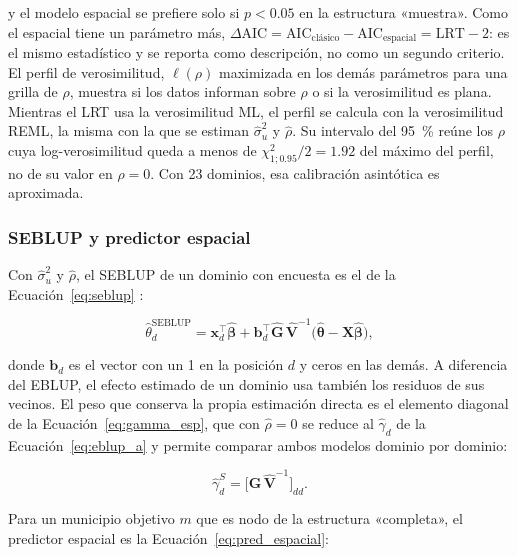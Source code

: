 y el modelo espacial se prefiere solo si $p < 0.05$ en la estructura «muestra». Como el espacial tiene un parámetro más, $\Delta\text{AIC} = \text{AIC}_{\text{clásico}} - \text{AIC}_{\text{espacial}} = \text{LRT} - 2$: es el mismo estadístico y se reporta como descripción, no como un segundo criterio. El perfil de verosimilitud, $\ell(\rho)$ maximizada en los demás parámetros para una grilla de $\rho$, muestra si los datos informan sobre $\rho$ o si la verosimilitud es plana. Mientras el LRT usa la verosimilitud ML, el perfil se calcula con la verosimilitud REML, la misma con la que se estiman $\hat{\sigma}_u^2$ y $\hat{\rho}$. Su intervalo del 95~\% reúne los $\rho$ cuya log-verosimilitud queda a menos de $\chi^2_{1;0.95}/2 = 1.92$ del máximo del perfil, no de su valor en $\rho = 0$. Con 23 dominios, esa calibración asintótica es aproximada.

\subsubsection{SEBLUP y predictor espacial}

Con $\hat{\sigma}_u^2$ y $\hat{\rho}$, el SEBLUP de un dominio con encuesta es el de la Ecuación~\ref{eq:seblup} \cite[p.~491]{morales2021smallarea}:

\begin{equation}
    \hat{\theta}_d^{\text{SEBLUP}} = \mathbf{x}_d^\top\hat{\boldsymbol{\beta}} + \mathbf{b}_d^\top \hat{\mathbf{G}}\, \hat{\mathbf{V}}^{-1}\big(\hat{\boldsymbol{\theta}} - \mathbf{X}\hat{\boldsymbol{\beta}}\big),
    \label{eq:seblup}
\end{equation}

donde $\mathbf{b}_d$ es el vector con un 1 en la posición $d$ y ceros en las demás. A diferencia del EBLUP, el efecto estimado de un dominio usa también los residuos de sus vecinos. El peso que conserva la propia estimación directa es el elemento diagonal de la Ecuación~\ref{eq:gamma_esp}, que con $\hat{\rho} = 0$ se reduce al $\hat{\gamma}_d$ de la Ecuación~\ref{eq:eblup_a} y permite comparar ambos modelos dominio por dominio:

\begin{equation}
    \hat{\gamma}^{S}_d = \big[\hat{\mathbf{G}}\,\hat{\mathbf{V}}^{-1}\big]_{dd} .
    \label{eq:gamma_esp}
\end{equation}

Para un municipio objetivo $m$ que es nodo de la estructura «completa», el predictor espacial es la Ecuación~\ref{eq:pred_espacial}:

